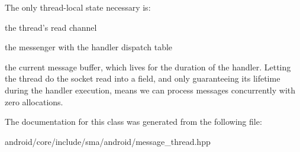 The only thread-\/local state necessary is\-:
\begin{DoxyItemize}
\item the thread's read channel
\item the messenger with the handler dispatch table
\item the current message buffer, which lives for the duration of the handler. Letting the thread do the socket read into a field, and only guaranteeing its lifetime during the handler execution, means we can process messages concurrently with zero allocations. 
\end{DoxyItemize}

The documentation for this class was generated from the following file\-:\begin{DoxyCompactItemize}
\item 
android/core/include/sma/android/message\-\_\-thread.\-hpp\end{DoxyCompactItemize}
